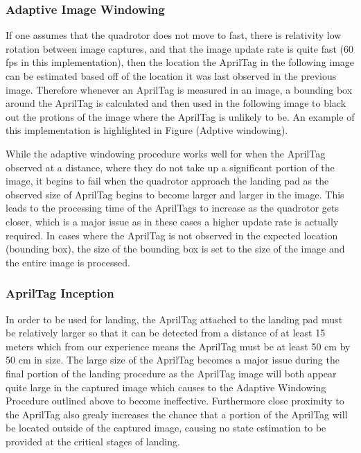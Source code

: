 \documentclass[11pt, twocolumn]{article}
\begin{document}
\subsubsection{Adaptive Image Windowing}

If one assumes that the quadrotor does not move to fast, there is relativity low rotation between image captures, and that the image update rate is quite fast (60 fps in this implementation), then the location the AprilTag in the following image can be estimated based off of the location it was last observed in the previous image. Therefore whenever an AprilTag is measured in an image, a bounding box around the AprilTag is calculated and then used in the following image to black out the protions of the image where the AprilTag is unlikely to be. An example of this implementation is highlighted in Figure (Adptive windowing).


While the adaptive windowing procedure works well for when the AprilTag observed at a distance, where they do not take up a significant portion of the image, it begins to fail when the quadrotor approach the landing pad as the observed size of AprilTag begins to become larger and larger in the  image. This leads to the processing time of the AprilTags to increase as the quadrotor gets closer, which is a major issue as in these cases a higher update rate is actually required. In cases where the AprilTag is not observed in the expected location (bounding box), the size of the bounding box is set to the size of the image and the entire image is processed. 

\subsubsection{AprilTag Inception}
 In order to be used for landing, the AprilTag attached to the landing pad must be relatively larger so that it can be detected from a distance of at least 15 meters which from our experience means the AprilTag must be at least 50 cm by 50 cm in size. The large size of the AprilTag becomes a major issue during the final portion of the landing procedure as the AprilTag image will both appear quite large in the captured image which causes to the Adaptive Windowing Procedure outlined above to become ineffective. Furthermore close proximity to the AprilTag also grealy increases the chance that a portion of the AprilTag will be located outside of the captured image, causing no state estimation to be provided at the critical stages of landing. 
 
\end{document}
